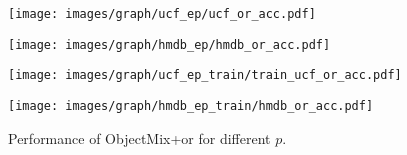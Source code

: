 \begin{figure}[t]
    \centering
    
    \begin{minipage}[t]{0.49\linewidth}
    \centering
    \texttt{[image: images/graph/ucf\_ep/ucf\_or\_acc.pdf]}
    \end{minipage}
    \hfill
    \begin{minipage}[t]{0.49\linewidth}
    \centering
    \texttt{[image: images/graph/hmdb\_ep/hmdb\_or\_acc.pdf]}
    \end{minipage}

    \begin{minipage}[t]{0.49\linewidth}
    \centering
    \texttt{[image: images/graph/ucf\_ep\_train/train\_ucf\_or\_acc.pdf]}
    \label{fig:ucf_or_acc_t}
    \end{minipage}
    \hfill
    \begin{minipage}[t]{0.49\linewidth}
    \centering
    \texttt{[image: images/graph/hmdb\_ep\_train/hmdb\_or\_acc.pdf]}
    \label{fig:hmdb_or_acc_t}
    \end{minipage}
    
    
    \caption{
    Performance of ObjectMix+or for different $p$.
    }
    \label{fig:ObjectMix+or_graph}

\end{figure}







